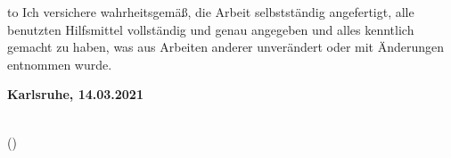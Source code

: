 
\thispagestyle{empty}
\null\vfill
\noindent\hbox to \textwidth{\hrulefill} 
%
{Ich versichere wahrheitsgemäß, die Arbeit
selbstständig angefertigt, alle benutzten Hilfsmittel vollständig und genau
angegeben und alles kenntlich gemacht zu haben, was aus Arbeiten anderer
unverändert oder mit Änderungen entnommen wurde.}
 
 
\textbf{Karlsruhe, 14.03.2021}
\vspace{1.5cm}

\dotfill\hspace*{8.0cm}\\
\hspace*{2cm}(\theauthor) 
\cleardoublepage